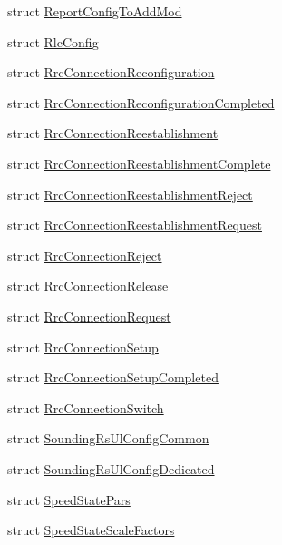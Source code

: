 \begin{DoxyCompactItemize}
struct \hyperlink{structns3_1_1LteRrcSap_1_1ReportConfigToAddMod}{Report\+Config\+To\+Add\+Mod}
\item 
struct \hyperlink{structns3_1_1LteRrcSap_1_1RlcConfig}{Rlc\+Config}
\item 
struct \hyperlink{structns3_1_1LteRrcSap_1_1RrcConnectionReconfiguration}{Rrc\+Connection\+Reconfiguration}
\item 
struct \hyperlink{structns3_1_1LteRrcSap_1_1RrcConnectionReconfigurationCompleted}{Rrc\+Connection\+Reconfiguration\+Completed}
\item 
struct \hyperlink{structns3_1_1LteRrcSap_1_1RrcConnectionReestablishment}{Rrc\+Connection\+Reestablishment}
\item 
struct \hyperlink{structns3_1_1LteRrcSap_1_1RrcConnectionReestablishmentComplete}{Rrc\+Connection\+Reestablishment\+Complete}
\item 
struct \hyperlink{structns3_1_1LteRrcSap_1_1RrcConnectionReestablishmentReject}{Rrc\+Connection\+Reestablishment\+Reject}
\item 
struct \hyperlink{structns3_1_1LteRrcSap_1_1RrcConnectionReestablishmentRequest}{Rrc\+Connection\+Reestablishment\+Request}
\item 
struct \hyperlink{structns3_1_1LteRrcSap_1_1RrcConnectionReject}{Rrc\+Connection\+Reject}
\item 
struct \hyperlink{structns3_1_1LteRrcSap_1_1RrcConnectionRelease}{Rrc\+Connection\+Release}
\item 
struct \hyperlink{structns3_1_1LteRrcSap_1_1RrcConnectionRequest}{Rrc\+Connection\+Request}
\item 
struct \hyperlink{structns3_1_1LteRrcSap_1_1RrcConnectionSetup}{Rrc\+Connection\+Setup}
\item 
struct \hyperlink{structns3_1_1LteRrcSap_1_1RrcConnectionSetupCompleted}{Rrc\+Connection\+Setup\+Completed}
\item 
struct \hyperlink{structns3_1_1LteRrcSap_1_1RrcConnectionSwitch}{Rrc\+Connection\+Switch}
\item 
struct \hyperlink{structns3_1_1LteRrcSap_1_1SoundingRsUlConfigCommon}{Sounding\+Rs\+Ul\+Config\+Common}
\item 
struct \hyperlink{structns3_1_1LteRrcSap_1_1SoundingRsUlConfigDedicated}{Sounding\+Rs\+Ul\+Config\+Dedicated}
\item 
struct \hyperlink{structns3_1_1LteRrcSap_1_1SpeedStatePars}{Speed\+State\+Pars}
\item 
struct \hyperlink{structns3_1_1LteRrcSap_1_1SpeedStateScaleFactors}{Speed\+State\+Scale\+Factors}

\end{DoxyCompactItemize}
